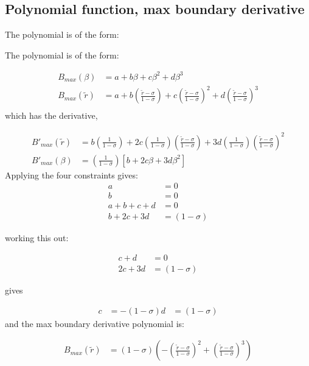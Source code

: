 \documentclass[a4paper]{article}
\begin{document}
\subsection{Polynomial function, max boundary derivative}
The polynomial is of the form:

The polynomial is of the form: 

\begin{align*}
    B_{max} \left( \beta \right) &= 
    a + b \beta + c \beta^2 + d \beta^3                   \\
    B_{max} \left( \widetilde{r} \right) &= 
    a + b \left( \frac{\widetilde{r} - \sigma}{1 - \sigma} \right)+
    c\left( \frac{\widetilde{r} - \sigma}{1 - \sigma} \right)  ^2+
    d\left( \frac{\widetilde{r} - \sigma}{1 - \sigma} \right)^3                    \\
\end{align*}
which has the derivative,


\begin{align*}
    B'_{max} \left( \widetilde{r} \right) &= 
    b \left( \frac{1}{1 - \sigma} \right)+
    2 c\left( \frac{1}{1 - \sigma} \right)\left( \frac{\widetilde{r} - \sigma}{1 - \sigma} \right)  +
    3 d\left( \frac{1}{1-\sigma} \right)\left( \frac{\widetilde{r} - \sigma}{1 - \sigma} \right)^2\\
    B'_{max} \left( \beta \right) &= 
    \left( \frac{1}{1 - \sigma} \right)
    \left[
    b +
    2 c \beta + 
    3 d \beta^2
    \right]
\end{align*}
Applying the four constraints gives:
\begin{align*}
    a &= 0 \\
    b &= 0 \\
    a + b + c + d &= 0 \\
    b + 2c + 3d &= (1-\sigma)
\end{align*} 

working this out: 

\begin{align*}
    c + d &=  0 \\
    2c + 3d &= (1 - \sigma)
\end{align*} 

gives 

\begin{align*}
    c &= -\left( 1 - \sigma\right)
    d &= \left( 1 - \sigma\right)
\end{align*}
and the max boundary derivative polynomial is:

\begin{align*}
    B_{max} \left( \widetilde{r} \right) &= 
    \left( 1 - \sigma \right) \left( 
        - \left( \frac{\widetilde{r}-\sigma}{1 - \sigma} \right)^2 +
        \left( \frac{\widetilde{r}-\sigma}{1-\sigma} \right)^3
    \right)
\end{align*}
\end{document}

